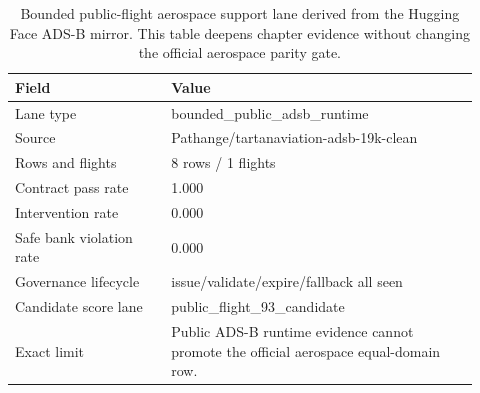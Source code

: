 \begin{table}[htbp]
\centering
\small
\caption{Bounded public-flight aerospace support lane derived from the Hugging Face ADS-B mirror. This table deepens chapter evidence without changing the official aerospace parity gate.}
\label{tab:aerospace-public-flight-support}
\begin{tabular}{p{0.31\linewidth}p{0.61\linewidth}}
\toprule
\textbf{Field} & \textbf{Value}\\
\midrule
Lane type & bounded\_public\_adsb\_runtime\\
Source & Pathange/tartanaviation-adsb-19k-clean\\
Rows and flights & 8 rows / 1 flights\\
Contract pass rate & 1.000\\
Intervention rate & 0.000\\
Safe bank violation rate & 0.000\\
Governance lifecycle & issue/validate/expire/fallback all seen\\
Candidate score lane & public\_flight\_93\_candidate\\
Exact limit & Public ADS-B runtime evidence cannot promote the official aerospace equal-domain row.\\
\bottomrule
\end{tabular}
\end{table}
